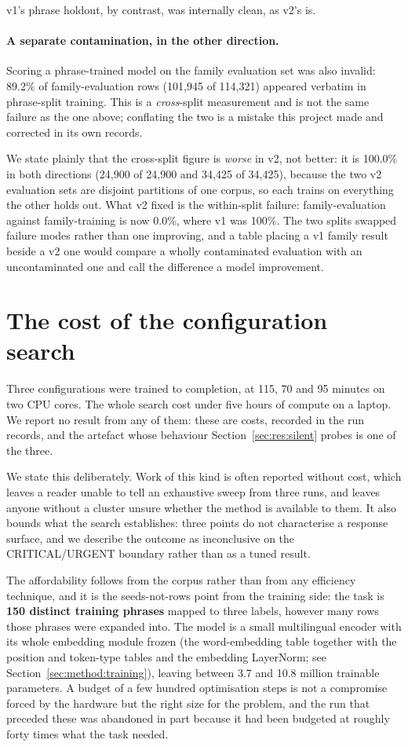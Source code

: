 v1's phrase holdout, by contrast, was internally clean, as v2's is.

\paragraph{A separate contamination, in the other direction.} Scoring a
phrase-trained model on the family evaluation set was also invalid: 89.2\% of
family-evaluation rows (101{,}945 of 114{,}321) appeared verbatim in
phrase-split training. This is a \emph{cross}-split measurement and is not the
same failure as the one above; conflating the two is a mistake this project
made and corrected in its own records.

We state plainly that the cross-split figure is \emph{worse} in v2, not
better: it is 100.0\% in both directions (24{,}900 of 24{,}900 and 34{,}425 of
34{,}425), because the two v2 evaluation sets are disjoint partitions of one
corpus, so each trains on everything the other holds out. What v2 fixed is the
within-split failure: family-evaluation against family-training is now
0.0\%, where v1 was 100\%. The two splits swapped failure modes rather than
one improving, and a table placing a v1 family result beside a v2 one would
compare a wholly contaminated evaluation with an uncontaminated one and call
the difference a model improvement.

\section{The cost of the configuration search}
\label{app:search}

Three configurations were trained to completion, at 115, 70 and 95 minutes on
two CPU cores. The whole search cost under five hours of compute on a laptop. We
report no result from any of them: these are costs, recorded in the run records,
and the artefact whose behaviour Section~\ref{sec:res:silent} probes is one of
the three.

We state this deliberately. Work of this kind is often reported without cost,
which leaves a reader unable to tell an exhaustive sweep from three runs, and
leaves anyone without a cluster unsure whether the method is available to them.
It also bounds what the search establishes: three points do not characterise a
response surface, and we describe the outcome as inconclusive on the
CRITICAL/URGENT boundary rather than as a tuned result.

The affordability follows from the corpus rather than from any efficiency
technique, and it is the seeds-not-rows point from the training side: the task is
\textbf{150 distinct training phrases} mapped to three labels, however many rows
those phrases were expanded into. The model is a small multilingual encoder with
its whole embedding module frozen (the word-embedding table together with the
position and token-type tables and the embedding LayerNorm; see
Section~\ref{sec:method:training}), leaving between 3.7 and 10.8 million trainable
parameters. A budget of a few hundred optimisation steps is not a compromise
forced by the hardware but the right size for the problem, and the run that
preceded these was abandoned in part because it had been budgeted at roughly
forty times what the task needed.

